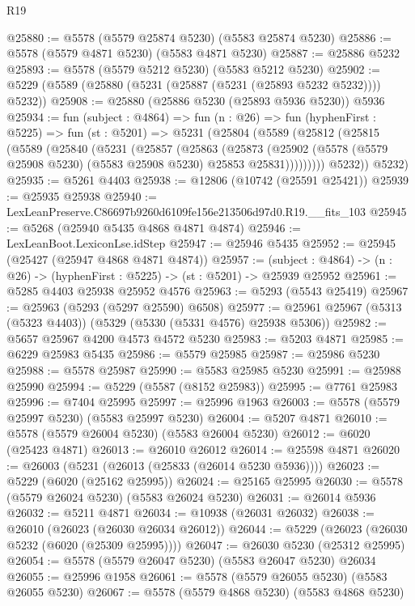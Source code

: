 \begin{lexlean}{R19}
\begin{coremodule}
@25880 := @5578 (@5579 @25874 @5230) (@5583 @25874 @5230)
@25886 := @5578 (@5579 @4871 @5230) (@5583 @4871 @5230)
@25887 := @25886 @5232
@25893 := @5578 (@5579 @5212 @5230) (@5583 @5212 @5230)
@25902 := @5229 (@5589 (@25880 (@5231 (@25887 (@5231 (@25893 @5232 @5232)))) @5232))
@25908 := @25880 (@25886 @5230 (@25893 @5936 @5230)) @5936
@25934 := fun (subject : @4864) =>
  fun (n : @26) =>
  fun (hyphenFirst : @5225) =>
  fun (st : @5201) =>
  @5231
    (@25804
      (@5589
        (@25812
          (@25815
            (@5589
              (@25840
                (@5231
                  (@25857
                    (@25863
                      (@25873
                        (@25902
                          (@5578 (@5579 @25908 @5230) (@5583 @25908 @5230) @25853 @25831)))))))))
          @5232))
      @5232)
@25935 := @5261 @4403
@25938 := @12806 (@10742 (@25591 @25421))
@25939 := @25935 @25938
@25940 := LexLeanPreserve.C86697b9260d6109fe156e213506d97d0.R19.__fits_103
@25945 := @5268 (@25940 @5435 @4868 @4871 @4874)
@25946 := LexLeanBoot.LexiconLse.idStep
@25947 := @25946 @5435
@25952 := @25945 (@25427 (@25947 @4868 @4871 @4874))
@25957 := (subject : @4864) -> (n : @26) -> (hyphenFirst : @5225) -> (st : @5201) -> @25939 @25952
@25961 := @5285 @4403 @25938 @25952 @4576
@25963 := @5293 (@5543 @25419)
@25967 := @25963 (@5293 (@5297 @25590) @6508)
@25977 := @25961 @25967 (@5313 (@5323 @4403)) (@5329 (@5330 (@5331 @4576) @25938 @5306))
@25982 := @5657 @25967 @4200 @4573 @4572 @5230
@25983 := @5203 @4871
@25985 := @6229 @25983 @5435
@25986 := @5579 @25985
@25987 := @25986 @5230
@25988 := @5578 @25987
@25990 := @5583 @25985 @5230
@25991 := @25988 @25990
@25994 := @5229 (@5587 (@8152 @25983))
@25995 := @7761 @25983
@25996 := @7404 @25995
@25997 := @25996 @1963
@26003 := @5578 (@5579 @25997 @5230) (@5583 @25997 @5230)
@26004 := @5207 @4871
@26010 := @5578 (@5579 @26004 @5230) (@5583 @26004 @5230)
@26012 := @6020 (@25423 @4871)
@26013 := @26010 @26012
@26014 := @25598 @4871
@26020 := @26003 (@5231 (@26013 (@25833 (@26014 @5230 @5936))))
@26023 := @5229 (@6020 (@25162 @25995))
@26024 := @25165 @25995
@26030 := @5578 (@5579 @26024 @5230) (@5583 @26024 @5230)
@26031 := @26014 @5936
@26032 := @5211 @4871
@26034 := @10938 (@26031 @26032)
@26038 := @26010 (@26023 (@26030 @26034 @26012))
@26044 := @5229 (@26023 (@26030 @5232 (@6020 (@25309 @25995))))
@26047 := @26030 @5230 (@25312 @25995)
@26054 := @5578 (@5579 @26047 @5230) (@5583 @26047 @5230) @26034
@26055 := @25996 @1958
@26061 := @5578 (@5579 @26055 @5230) (@5583 @26055 @5230)
@26067 := @5578 (@5579 @4868 @5230) (@5583 @4868 @5230)

\end{coremodule}
\end{lexlean}
